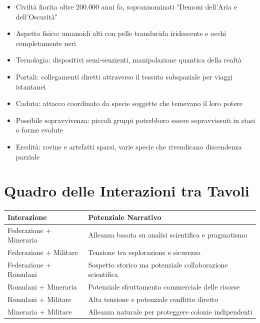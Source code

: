 \documentclass[11pt,a4paper]{article}
\begin{document}
\begin{tcolorbox}[colback=iconianblue!20, colframe=iconianblue]
\begin{itemize}[leftmargin=*]
\item Civiltà fiorita oltre 200.000 anni fa, soprannominati "Demoni dell'Aria e dell'Oscurità"
\item Aspetto fisico: umanoidi alti con pelle translucida iridescente e occhi completamente neri
\item Tecnologia: dispositivi semi-senzienti, manipolazione quantica della realtà
\item Portali: collegamenti diretti attraverso il tessuto subspaziale per viaggi istantanei
\item Caduta: attacco coordinato da specie soggette che temevano il loro potere
\item Possibile sopravvivenza: piccoli gruppi potrebbero essere sopravvissuti in stasi o forme evolute
\item Eredità: rovine e artefatti sparsi, varie specie che rivendicano discendenza parziale
\end{itemize}
\end{tcolorbox}

\section{Quadro delle Interazioni tra Tavoli}

\begin{tcolorbox}[colback=masterlightpurple!10, colframe=masterpurple]
\begin{tabularx}{\textwidth}{|l|X|}
\hline
\rowcolor{masterlightpurple!30} \textbf{Interazione} & \textbf{Potenziale Narrativo} \\
\hline
Federazione + Mineraria & Alleanza basata su analisi scientifica e pragmatismo \\
\hline
Federazione + Militare & Tensione tra esplorazione e sicurezza \\
\hline
Federazione + Romulani & Sospetto storico ma potenziale collaborazione scientifica \\
\hline
Romulani + Mineraria & Potenziale sfruttamento commerciale delle risorse \\
\hline
Romulani + Militare & Alta tensione e potenziale conflitto diretto \\
\hline
Mineraria + Militare & Alleanza naturale per proteggere colonie indipendenti \\
\hline
\end{tabularx}
\end{tcolorbox}
\end{document}
